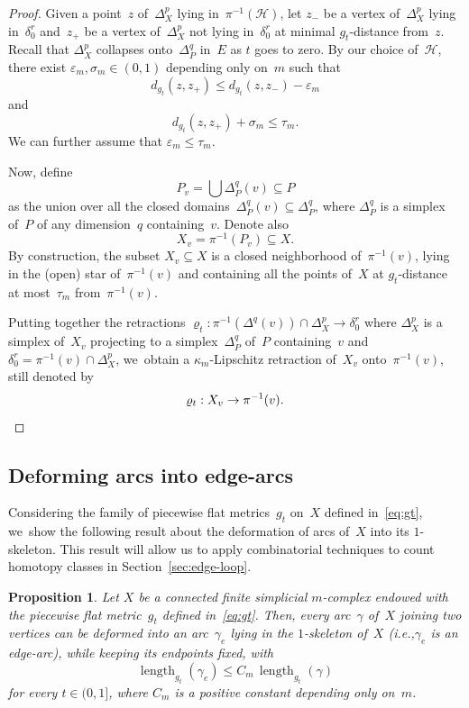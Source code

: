 \documentclass[11pt]{article}
\newcommand{\ie}{i.e.,\xspace}
\newtheorem{proposition}[theorem]{Proposition}
\theoremstyle{definition}
\DeclareMathOperator{\length}{length}
\numberwithin{equation}{section}
\begin{document}
\begin{proof}
Given a point~$z$ of~$\Delta_X^p$ lying in~$\pi^{-1}(\mathcal{H})$, let $z_-$ be a vertex of~$\Delta_X^p$ lying in~$\delta_0^r$ and~$z_+$ be a vertex of~$\Delta_X^p$ not lying in~$\delta_0^r$ at minimal $g_t$-distance from~$z$.
Recall that $\Delta_X^p$ collapses onto~$\Delta_P^q$ in~$E$ as $t$ goes to zero.
By our choice of~$\mathcal{H}$, there exist $\varepsilon_m, \sigma_m \in (0,1)$ depending only on~$m$ such that
\[
d_{g_t}(z,z_+) \leq d_{g_t}(z,z_-) - \varepsilon_m
\]
and
\[
d_{g_t}(z,z_+) + \sigma_m \leq \tau_m.
\]
We can further assume that $\varepsilon_m \leq \tau_m$.

Now, define
\begin{equation} \label{eq:Pv}
P_v = \bigcup \Delta_P^q(v) \subseteq P
\end{equation}
as the union over all the closed domains~$\Delta_P^q(v) \subseteq \Delta_P^q$, where $\Delta_P^q$ is a simplex of~$P$ of any dimension~$q$ containing~$v$.
Denote also
\begin{equation} \label{eq:Xv}
X_v = \pi^{-1}(P_v) \subseteq X.
\end{equation}
By construction, the subset $X_v \subseteq X$ is a closed neighborhood of~$\pi^{-1}(v)$, lying in the (open) star of~$\pi^{-1}(v)$ and containing all the points of~$X$ at $g_t$-distance at most~$\tau_m$ from~$\pi^{-1}(v)$.

Putting together the retractions $\varrho_t : \pi^{-1}(\Delta^q(v)) \cap \Delta_X^p \to \delta_0^r$ where $\Delta_X^p$ is a simplex of~$X_v$ projecting to a simplex~$\Delta_P^q$ of~$P$ containing~$v$ and $\delta_0^r= \pi^{-1}(v) \cap \Delta_X^p$, we~obtain a $\kappa_m$-Lipschitz retraction of~$X_v$ onto~$\pi^{-1}(v)$, still denoted by
\[
\varrho_t:X_v \to \pi^{-1}(v).\qedhere
\]
\end{proof}

\subsection{Deforming arcs into edge-arcs} \label{sec:deforming}

Considering the family of piecewise flat metrics~$g_t$ on~$X$ defined in~\eqref{eq:gt}, we~show the following result about the deformation of arcs of~$X$ into its $1$-skeleton.
This result will allow us to apply combinatorial techniques to count homotopy classes in Section~\ref{sec:edge-loop}.

\begin{proposition} \label{prop:deforming}
Let $X$ be a connected finite simplicial $m$\nobreakdash-complex endowed with the piecewise flat metric~$g_t$ defined in~\eqref{eq:gt}.
Then, every arc~$\gamma$ of~$X$ joining two vertices can be deformed into an arc~$\gamma_e$ lying in the $1$-skeleton of~$X$ (\ie $\gamma_e$ is an edge-arc), while keeping its endpoints fixed, with
\begin{equation} \label{eq:deforming}
\length_{g_t}(\gamma_e) \leq C_m \, \length_{g_t}(\gamma)
\end{equation}
for every $t \in (0,1]$, where $C_m$ is a positive constant depending only on~$m$.
\end{proposition}
\end{document}
